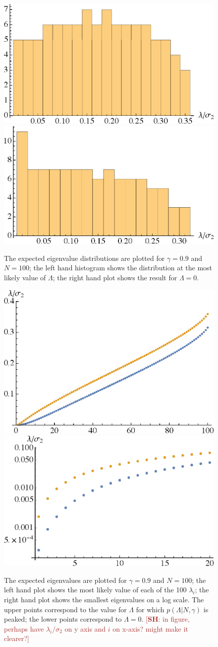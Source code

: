 \documentclass[12pt]{article}
\newcommand{\SH}[1]{\textcolor{brown}{[{\bf SH}: #1]}}
\begin{document}
\begin{figure} 
  \centering
  \includegraphics[width=.45\linewidth]{h1_100.eps} \hfill \includegraphics[width=.45\linewidth]{h2_100.eps}
  \caption{The expected eigenvalue distributions are plotted for $\gamma=0.9$ and $N=100$; the left hand histogram shows the distribution at the most likely value of $\Lambda$; the right hand plot shows the result for $\Lambda=0$.}
  \label{eigendist1}
\end{figure}

\begin{figure} 
  \centering
  \includegraphics[width=.45\linewidth]{l1_100.eps} \hfill \includegraphics[width=.45\linewidth]{l2_100.eps}
  \caption{The expected eigenvalues are plotted for $\gamma=0.9$ and $N=100$; the left hand plot shows the most likely value of each of the 100 $\lambda_i$; the right hand plot shows the smallest eigenvalues on a log scale. The upper points correspond to the value for $\Lambda$ for which $p(\Lambda| N,\gamma)$  is peaked; the lower points correspond to $\Lambda=0$. \SH{in figure, perhaps have $\lambda_i/\sigma_2$ on y axis and $i$ on x-axis? might make it clearer?}}
  \label{eigendist2}
\end{figure}
\end{document}
